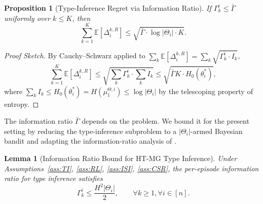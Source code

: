 \documentclass{article}
\newtheorem{proposition}[theorem]{Proposition}
\newtheorem{lemma}[theorem]{Lemma}
\begin{document}
\begin{proposition}[Type-Inference Regret via Information Ratio]
\label{prop:type-bound}
If $\Gamma_k^i \leq \bar{\Gamma}$ uniformly over $k \leq K$, then
\begin{equation}
\label{eq:type-bound}
\sum_{k=1}^K \mathbb{E}[\Delta_i^{k,R}] \leq \sqrt{\bar{\Gamma} \cdot \log|\Theta_i| \cdot K}.
\end{equation}
\end{proposition}

\begin{proof}[Proof Sketch]
By Cauchy--Schwarz applied to $\sum_k \mathbb{E}[\Delta_i^{k,R}] = \sum_k \sqrt{\Gamma_k^i \cdot I_k}$,
\begin{equation}
\sum_{k=1}^K \mathbb{E}[\Delta_i^{k,R}] \leq \sqrt{\sum_k \Gamma_k^i \cdot \sum_k I_k} \leq \sqrt{\bar{\Gamma} K \cdot H_0(\theta_i^*)},
\end{equation}
where $\sum_k I_k \leq H_0(\theta_i^*) = H(\mu_1^{\Theta,i}) \leq \log|\Theta_i|$ by the telescoping property of entropy.
\end{proof}

The information ratio $\bar{\Gamma}$ depends on the problem. We bound it for the present setting by reducing the type-inference subproblem to a $|\Theta_i|$-armed Bayesian bandit and adapting the information-ratio analysis of \citet{russo2016information}.

\begin{lemma}[Information Ratio Bound for HT-MG Type Inference]
\label{lem:info-ratio}
Under Assumptions~\ref{ass:TI}, \ref{ass:RL}, \ref{ass:ISI}, \ref{ass:CSR}, the per-episode information ratio for type inference satisfies
\begin{equation}
\Gamma_k^i \leq \frac{H^2 |\Theta_i|}{2}, \qquad \forall k \geq 1, \forall i \in [n].
\end{equation}
\end{lemma}
\end{document}
